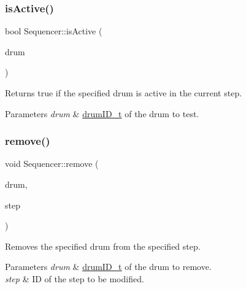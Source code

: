 \subsubsection{\texorpdfstring{is\+Active()}{isActive()}\hspace{0.1cm}{\footnotesize\ttfamily [2/2]}}
{\footnotesize\ttfamily bool Sequencer\+::is\+Active (\begin{DoxyParamCaption}\item[{\hyperlink{namespacedrumpi_a3897274035c1b939a604438abe648b1b}{drum\+I\+D\+\_\+t}}]{drum }\end{DoxyParamCaption})}

Returns {\ttfamily true} if the specified drum is active in the current step. 
\begin{DoxyParams}{Parameters}
{\em drum} & \hyperlink{namespacedrumpi_a3897274035c1b939a604438abe648b1b}{drum\+I\+D\+\_\+t} of the drum to test. \\
\hline
\end{DoxyParams}
\mbox{\label{classdrumpi_1_1Sequencer_a5b9b8acf415b43f72442f0a591054412}} 
\subsubsection{\texorpdfstring{remove()}{remove()}\hspace{0.1cm}{\footnotesize\ttfamily [1/2]}}
{\footnotesize\ttfamily void Sequencer\+::remove (\begin{DoxyParamCaption}\item[{\hyperlink{namespacedrumpi_a3897274035c1b939a604438abe648b1b}{drum\+I\+D\+\_\+t}}]{drum,  }\item[{int}]{step }\end{DoxyParamCaption})}

Removes the specified drum from the specified step. 
\begin{DoxyParams}{Parameters}
{\em drum} & \hyperlink{namespacedrumpi_a3897274035c1b939a604438abe648b1b}{drum\+I\+D\+\_\+t} of the drum to remove. \\
\hline
{\em step} & ID of the step to be modified. \\
\hline
\end{DoxyParams}
\mbox{\label{classdrumpi_1_1Sequencer_ad7fcb2041b2b68133def003eef420f99}} 
